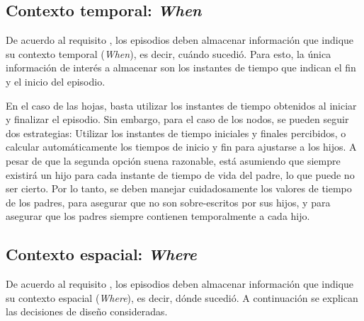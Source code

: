 \subsection{Contexto temporal: \textit{When}}\label{sec:design_ep_when}

De acuerdo al requisito , los episodios deben almacenar información que indique su contexto temporal (\textit{When}), es decir, cuándo  sucedió. Para esto, la única información de interés a almacenar son los instantes de tiempo que indican el fin y el inicio del episodio.

En el caso de las hojas, basta utilizar los instantes de tiempo obtenidos al iniciar y finalizar el episodio. Sin embargo, para el caso de los nodos, se pueden seguir dos estrategias: Utilizar los instantes de tiempo iniciales y finales percibidos, o calcular automáticamente los tiempos de inicio y fin para ajustarse a los hijos. A pesar de que la segunda opción suena razonable, está asumiendo que siempre existirá un hijo para cada instante de tiempo de vida del padre, lo que puede no ser cierto. Por lo tanto, se deben manejar cuidadosamente los valores de tiempo de los padres, para asegurar que no son sobre-escritos por sus hijos, y para asegurar que los padres siempre contienen temporalmente a cada hijo.


\subsection{Contexto espacial: \textit{Where}}\label{sec:design_ep_where}

De acuerdo al requisito , los episodios deben almacenar información que indique su contexto espacial (\textit{Where}), es decir, dónde sucedió. A continuación se explican las decisiones de diseño consideradas.

